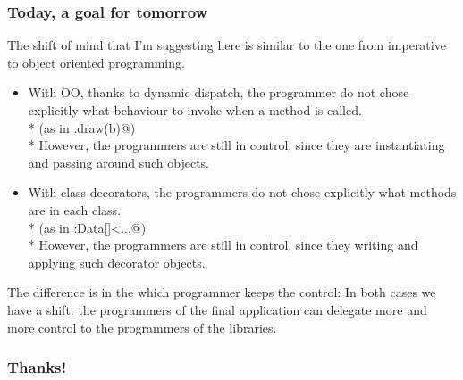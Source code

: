 \begin{frame}[fragile]
\frametitle{Today, a goal for tomorrow}
The shift of mind that I'm suggesting here is similar to the one from imperative to object oriented programming.
\begin{itemize}
\item With OO, thanks to dynamic dispatch, the programmer do not chose explicitly what behaviour to invoke when a method is called.\\*
(as in \Q@a.draw(b)@)\\*
However, the programmers are still in control, since they are instantiating and passing around such objects.
\item With class decorators, the programmers do not chose explicitly what methods are in each class.\\*
(as in \Q@Person:Data[]<...@)\\*
However, the programmers are still in control, since they writing and applying such decorator objects.
\end{itemize}
The difference is in the which programmer keeps the control:
In both cases we have a shift: the programmers of the final application can delegate more and more control to the programmers of the libraries.
\end{frame}

%
%
% 
%
%




\begin{frame}[fragile]
\frametitle{ Thanks! }
\end{frame}

